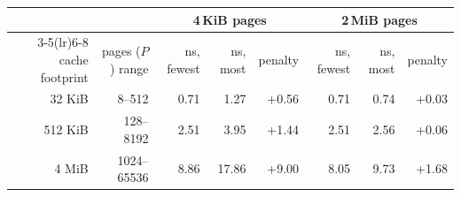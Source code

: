 \begin{tabular}{rrrrrrrr}
\toprule
 & & \multicolumn{3}{c}{4\,KiB pages} & \multicolumn{3}{c}{2\,MiB pages} \\
\cmidrule(lr){3-5}\cmidrule(lr){6-8}
cache footprint & pages ($P$) range & ns, fewest & ns, most & penalty & ns, fewest & ns, most & penalty \\
\midrule
32 KiB & 8--512 & 0.71 & 1.27 & +0.56 & 0.71 & 0.74 & +0.03 \\
512 KiB & 128--8192 & 2.51 & 3.95 & +1.44 & 2.51 & 2.56 & +0.06 \\
4 MiB & 1024--65536 & 8.86 & 17.86 & +9.00 & 8.05 & 9.73 & +1.68 \\
\bottomrule
\end{tabular}
